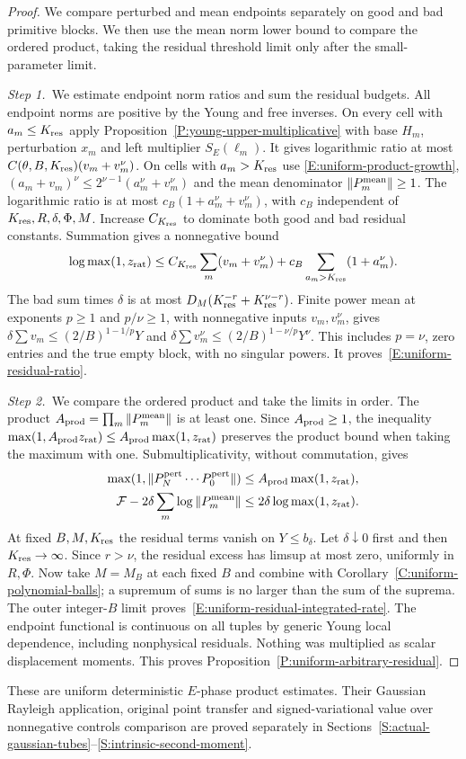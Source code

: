 \begin{proof}
  We compare perturbed and mean endpoints separately on good and bad primitive
  blocks. We then use the mean norm lower bound to compare the ordered
  product, taking the residual threshold limit only after the small-parameter
  limit.


  \medskip
  \noindent\textit{Step 1.~}We estimate endpoint norm ratios and sum the
  residual budgets.
  All endpoint norms are positive by the Young and free inverses. On every cell
  with $a_m \le K_{\rm res}$ apply
  Proposition~\ref{P:young-upper-multiplicative} with base $H_m$, perturbation
  $x_m$ and left multiplier $S_E(\ell_m)$. It gives logarithmic ratio at most
  $C(\theta,B,K_{\rm res})(v_m+v_m^\nu)$. On cells with $a_m > K_{\rm res}$ use
  \eqref{E:uniform-product-growth}, $(a_m+v_m)^\nu \le
  2^{\nu-1}(a_m^\nu+v_m^\nu)$ and the mean denominator $\|P_m^{\rm mean}\| \ge
  1$. The logarithmic ratio is at most $c_B(1+a_m^\nu+v_m^\nu)$, with $c_B$
  independent of $K_{\rm res},R,\delta,\Phi,M$. Increase $C_{K_{\rm res}}$ to
  dominate both good and bad residual constants. Summation gives a nonnegative
  bound
  \[
    \log\max(1,z_{\rm rat})
    \le C_{K_{\rm res}}\sum_m(v_m+v_m^\nu)
    +c_B\sum_{a_m>K_{\rm res}}(1+a_m^\nu).
  \]
  The bad sum times $\delta$ is at most $D_M(K_{\rm res}^{-r}+K_{\rm
  res}^{\nu-r})$. Finite power mean at exponents $p \ge 1$ and $p/\nu \ge 1$,
  with nonnegative inputs $v_m,v_m^\nu$, gives $\delta\sum v_m \le
  (2/B)^{1-1/p}Y$ and $\delta\sum v_m^\nu \le (2/B)^{1-\nu/p}Y^\nu$. This
  includes $p = \nu$, zero entries and the true empty block, with no singular
  powers. It proves~\eqref{E:uniform-residual-ratio}.


  \medskip
  \noindent\textit{Step 2.~}We compare the ordered product and take the limits
  in order.
  The product $A_{\rm prod} = \prod_m\|P_m^{\rm mean}\|$ is at least one.
  Since $A_{\rm prod}\ge1$, the inequality $\max(1,A_{\rm prod}z_{\rm rat})\le
  A_{\rm prod}\max(1,z_{\rm rat})$ preserves the product bound when taking the
  maximum with one.
  Submultiplicativity, without commutation, gives
  \[
    \begin{aligned}
      \max(1,\|P_N^{\rm pert}\cdots P_0^{\rm pert}\|)
      &\le A_{\rm prod}\max(1,z_{\rm rat}),\\
      \mathcal{F}-2\delta\sum_m\log\|P_m^{\rm mean}\|
      &\le2\delta\log\max(1,z_{\rm rat}).
    \end{aligned}
  \]
  At fixed $B,M,K_{\rm res}$ the residual terms vanish on $Y \le b_\delta$. Let
  $\delta\downarrow0$ first and then $K_{\rm res} \to \infty$. Since $r > \nu$,
  the residual excess has limsup at most zero, uniformly in $R,\Phi$. Now take
  $M = M_B$ at each fixed $B$ and combine with
  Corollary~\ref{C:uniform-polynomial-balls}; a supremum of sums is no larger
  than the sum of the suprema. The outer integer-$B$ limit
  proves~\eqref{E:uniform-residual-integrated-rate}. The endpoint functional is
  continuous on all tuples by generic Young local dependence, including
  nonphysical residuals. Nothing was multiplied as scalar displacement moments.
  This proves Proposition~\ref{P:uniform-arbitrary-residual}.
\end{proof}

These are uniform deterministic $E$-phase product estimates. Their Gaussian
Rayleigh application, original point transfer and signed-variational value over
nonnegative controls comparison are proved separately in
Sections~\ref{S:actual-gaussian-tubes}--\ref{S:intrinsic-second-moment}.
